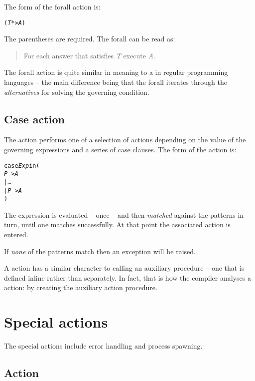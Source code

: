 The form of the forall action is:
\begin{alltt}
(\emph{T}*>\emph{A})
\end{alltt}
The parentheses are required. The forall can be read as:
\begin{quote}
For each answer that satisfies \emph{T} execute \emph{A}.
\end{quote}

The forall action is quite similar in meaning to a  in regular programming languages -- the main difference being that the forall iterates through the \emph{alternatives} for solving the governing condition.

\subsection{Case action}
\label{action:case}
The  action performs one of a selection of actions depending on the value of the governing expressions and a series of case clauses. The form of the  action is:
\begin{alltt}
case \emph{Exp} in (
  \emph{P} -> \emph{A}
| \ldots
| \emph{P\subn} -> \emph{A\subn}
)
\end{alltt}
The expression  is evaluated -- once -- and then \emph{matched} against the patterns  in turn, until one matches successfully. At that point the associated action  is entered.

If \emph{none} of the patterns match then an  exception will be raised.

A  action has a similar character to calling an auxiliary procedure -- one that is defined inline rather than separately. In fact, that is how the compiler analyses a  action: by creating the auxiliary action procedure.

\section{Special actions}
\label{action:special}

The special actions include error handling and process spawning.

\subsection{ Action}
\label{action:valis}

